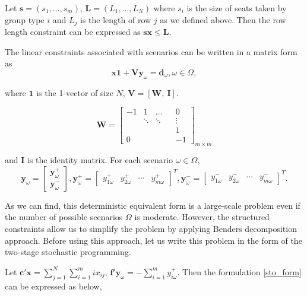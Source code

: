 
Let $\mathbf{s} = (s_1, \ldots, s_m)$, $\mathbf{L} = (L_1, \ldots, L_N)$ where $s_i$ is the size of seats taken by group type $i$ and $L_j$ is the length of row $j$ as we defined above. Then the row length constraint can be expressed as $\mathbf{s} \mathbf{x} \leq \mathbf{L}$.

The linear constraints associated with scenarios can be written in a matrix form as
\[\mathbf{x} \mathbf{1} + \mathbf{V} \mathbf{y}_\omega = \mathbf{d}_\omega, \omega\in \Omega,\]

where $\mathbf{1}$ is the 1-vector of size $N$, $\mathbf{V} = [\mathbf{W}, ~\mathbf{I}]$.  

$$
\mathbf{W}=\left[\begin{array}{ccccc}
-1 & 1 & \ldots & & 0 \\
& \ddots & \ddots & & \vdots \\
& & & & 1 \\
0 & & & & -1
\end{array}\right]_{m \times m}
$$

and $\mathbf{I}$ is the identity matrix. For each scenario $\omega \in \Omega$,
$$
\mathbf{y}_{\omega}=\left[\begin{array}{l}
\mathbf{y}_{\omega}^{+} \\
\mathbf{y}_{\omega}^{-}
\end{array}\right], \mathbf{y}_{\omega}^{+}=\left[\begin{array}{lllll}y_{1 \omega}^{+} & y_{2 \omega}^{+} & \cdots & y_{m \omega}^{+}\end{array}\right]^{T}, \mathbf{y}_{\omega}^{-}=\left[\begin{array}{llll}y_{1 \omega}^{-} & y_{2 \omega}^{-} & \cdots & y_{m \omega}^{-}\end{array}\right]^{T}.
$$

As we can find, this deterministic equivalent form is a large-scale problem even if the number of possible scenarios $\Omega$ is moderate. However, the structured constraints allow us to simplify the problem by applying Benders decomposition approach. Before using this approach, let us write this problem in the form of the two-stage stochastic programming.

Let $\mathbf{c}{'}\mathbf{x} = \sum_{j =1}^{N} \sum_{i=1}^m i x_{ij}$, $\mathbf{f}{'}\mathbf{y}_{\omega} = -\sum_{i=1}^{m} y_{i \omega}^{+}$. Then the formulation \eqref{sto_form} can be expressed as below,

